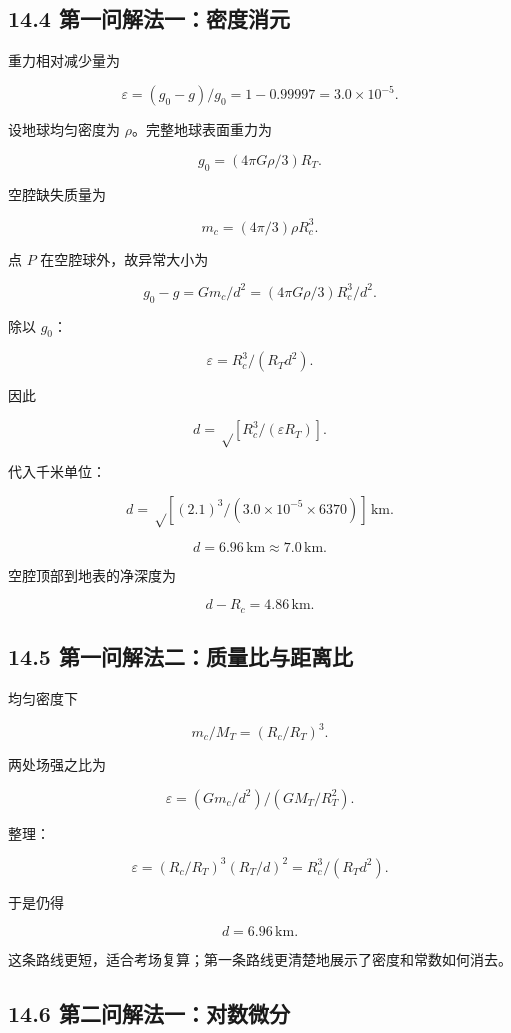 \documentclass[
  11pt,
  UTF8]{ctexart}
\begin{document}
\hypertarget{ux7b2cux4e00ux95eeux89e3ux6cd5ux4e00ux5bc6ux5ea6ux6d88ux5143}{%
\subsection{14.4
第一问解法一：密度消元}\label{ux7b2cux4e00ux95eeux89e3ux6cd5ux4e00ux5bc6ux5ea6ux6d88ux5143}}

重力相对减少量为

\[ε=(g_0-g)/g_0=1-0.99997=3.0×10^{-5}.\]

设地球均匀密度为 \(ρ\)。完整地球表面重力为

\[g_0=(4πGρ/3)R_T.\]

空腔缺失质量为

\[m_c=(4π/3)ρR_c^3.\]

点 \(P\) 在空腔球外，故异常大小为

\[g_0-g=Gm_c/d^2=(4πGρ/3)R_c^3/d^2.\]

除以 \(g_0\)：

\[ε=R_c^3/(R_Td^2).\]

因此

\[d=√[R_c^3/(εR_T)].\]

代入千米单位：

\[d=√[(2.1)^3/(3.0×10^{-5}×6370)]\,\mathrm{km}.\]

\[d=6.96\,\mathrm{km}≈7.0\,\mathrm{km}.\]

空腔顶部到地表的净深度为

\[d-R_c=4.86\,\mathrm{km}.\]

\hypertarget{ux7b2cux4e00ux95eeux89e3ux6cd5ux4e8cux8d28ux91cfux6bd4ux4e0eux8dddux79bbux6bd4}{%
\subsection{14.5
第一问解法二：质量比与距离比}\label{ux7b2cux4e00ux95eeux89e3ux6cd5ux4e8cux8d28ux91cfux6bd4ux4e0eux8dddux79bbux6bd4}}

均匀密度下

\[m_c/M_T=(R_c/R_T)^3.\]

两处场强之比为

\[ε=(Gm_c/d^2)/(GM_T/R_T^2).\]

整理：

\[ε=(R_c/R_T)^3(R_T/d)^2=R_c^3/(R_Td^2).\]

于是仍得

\[d=6.96\,\mathrm{km}.\]

这条路线更短，适合考场复算；第一条路线更清楚地展示了密度和常数如何消去。

\hypertarget{ux7b2cux4e8cux95eeux89e3ux6cd5ux4e00ux5bf9ux6570ux5faeux5206}{%
\subsection{14.6
第二问解法一：对数微分}\label{ux7b2cux4e8cux95eeux89e3ux6cd5ux4e00ux5bf9ux6570ux5faeux5206}}
\end{document}
